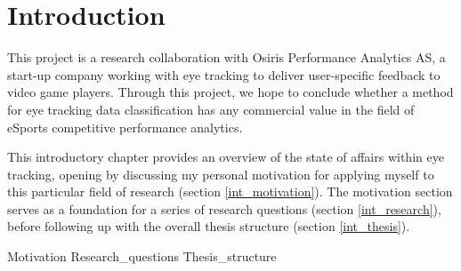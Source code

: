 \chapter{Introduction} \label{ch:intro}


This project is a research collaboration with Osiris Performance Analytics AS, a start-up company working with eye tracking to deliver user-specific feedback to video game players. Through this project, we hope to conclude whether a method for eye tracking data classification has any commercial value in the field of eSports competitive performance analytics.

This introductory chapter provides an overview of the state of affairs within eye tracking, opening by discussing my personal motivation for applying myself to this particular field of research (section \ref{int_motivation}). The motivation section serves as a foundation for a series of research questions (section \ref{int_research}), before following up with the overall thesis structure (section \ref{int_thesis}).

{Motivation}
{Research_questions}
{Thesis_structure}


